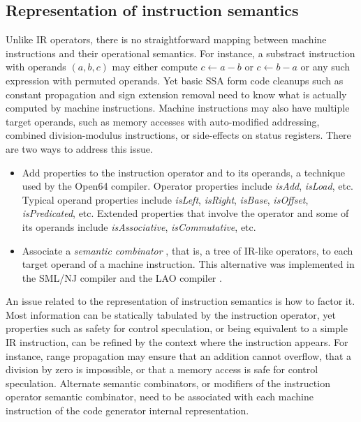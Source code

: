 
\subsection{Representation of instruction semantics}

Unlike IR operators, there is no straightforward mapping between machine
instructions and their operational semantics. For instance, a substract instruction with
operands $(a,b,c)$ may either compute $c \leftarrow a-b$ or $c \leftarrow b-a$
or any such expression with permuted operands. Yet basic SSA form code cleanups
such as constant propagation and sign extension removal need to know what is
actually computed by machine instructions.  Machine instructions may also have
multiple target operands, such as memory accesses with auto-modified addressing,
combined division-modulus instructions, or side-effects on status registers.
There are two ways to address this issue.
\begin{itemize} \item Add properties to the instruction operator and to
its operands, a technique used by the Open64 compiler. Operator properties
include \emph{isAdd}, \emph{isLoad}, etc. Typical operand properties include
\emph{isLeft}, \emph{isRight}, \emph{isBase}, \emph{isOffset},
\emph{isPredicated}, etc. Extended properties that involve the operator and some
of its operands include \emph{isAssociative}, \emph{isCommutative}, etc.  \item
Associate a \emph{semantic combinator} \cite{Wand:1983:IC}, that is, a tree of IR-like operators, to
each target operand of a machine instruction. This alternative
was implemented in the SML/NJ \cite{Leung:1999:PLDI} compiler and the LAO
compiler \cite{Dinechin:2000:CASES}.  \end{itemize}

An issue related to the representation of instruction semantics is how to factor
it. Most information can be statically tabulated by the instruction operator,
yet properties such as safety for control speculation, or being equivalent to a
simple IR instruction, can be refined by the context where the instruction
appears. For instance, range propagation may ensure that an addition cannot
overflow, that a division by zero is impossible, or that a memory access is safe
for control speculation.  Alternate semantic combinators, or modifiers of the
instruction operator semantic combinator, need to be associated with each
machine instruction of the code generator internal representation.

